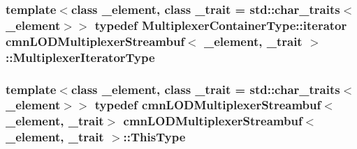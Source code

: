 \hypertarget{classcmn_l_o_d_multiplexer_streambuf_addfaa1fedcd4e3b6df8e4020ec2cbde3}{
\subsubsection[{Multiplexer\-Iterator\-Type}]{\setlength{\rightskip}{0pt plus 5cm}template$<$class \-\_\-element, class \-\_\-trait = std\-::char\-\_\-traits$<$\-\_\-element$>$$>$ typedef Multiplexer\-Container\-Type\-::iterator {\bf cmn\-L\-O\-D\-Multiplexer\-Streambuf}$<$ \-\_\-element, \-\_\-trait $>$\-::{\bf Multiplexer\-Iterator\-Type}}}\label{classcmn_l_o_d_multiplexer_streambuf_addfaa1fedcd4e3b6df8e4020ec2cbde3}
\hypertarget{classcmn_l_o_d_multiplexer_streambuf_aa50efd43cb53bb6be746e3990e02452a}{
\subsubsection[{This\-Type}]{\setlength{\rightskip}{0pt plus 5cm}template$<$class \-\_\-element, class \-\_\-trait = std\-::char\-\_\-traits$<$\-\_\-element$>$$>$ typedef {\bf cmn\-L\-O\-D\-Multiplexer\-Streambuf}$<$\-\_\-element, \-\_\-trait$>$ {\bf cmn\-L\-O\-D\-Multiplexer\-Streambuf}$<$ \-\_\-element, \-\_\-trait $>$\-::{\bf This\-Type}}}\label{classcmn_l_o_d_multiplexer_streambuf_aa50efd43cb53bb6be746e3990e02452a}


